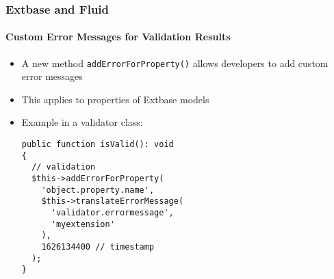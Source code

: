 %

\begin{frame}[fragile]
	\frametitle{Extbase and Fluid}
	\framesubtitle{Custom Error Messages for Validation Results}


	\begin{itemize}
		\item A new method \texttt{addErrorForProperty()} allows developers to
			add custom error messages
		\item This applies to properties of Extbase models
		\item Example in a validator class:
\begin{lstlisting}
public function isValid(): void
{
  // validation
  $this->addErrorForProperty(
    'object.property.name',
    $this->translateErrorMessage(
      'validator.errormessage',
      'myextension'
    ),
    1626134400 // timestamp
  );
}
\end{lstlisting}

	\end{itemize}

\end{frame}

